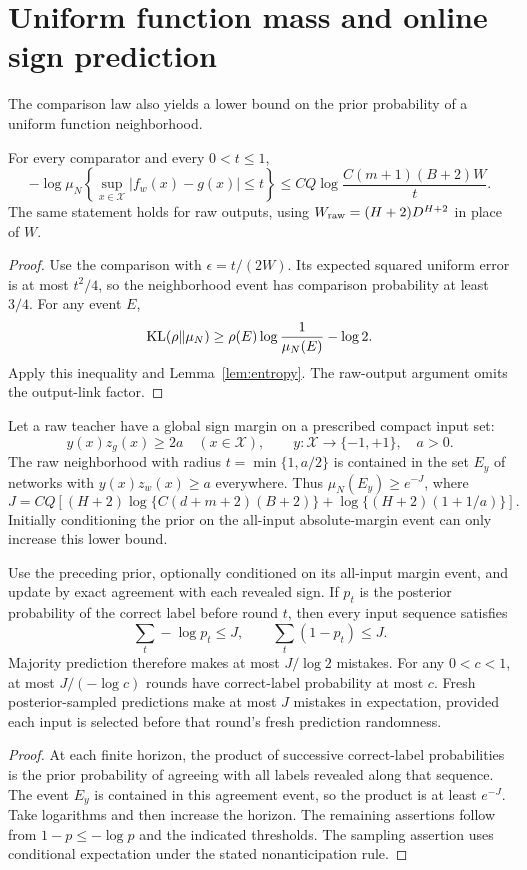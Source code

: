 \section{Uniform function mass and online sign prediction}
The comparison law also yields a lower bound on the prior probability of a uniform function neighborhood.

\begin{theorem}\label{thm:uniform-mass}
For every comparator and every $0<t\le1$,
\[
 -\log\mu_N\left\{\sup_{x\in\mathcal X}|f_w(x)-g(x)|\le t\right\}
 \le C Q\log\frac{C(m+1)(B+2)W}{t}.
\]
The same statement holds for raw outputs, using
$W_{\rm raw}=(H+2)D^{H+2}$ in place of $W$.
\end{theorem}
\begin{proof}
Use the comparison with $\epsilon=t/(2W)$. Its expected squared uniform error is at most $t^2/4$, so the neighborhood event has comparison probability at least $3/4$. For any event $E$,
\[
 \operatorname{KL}(\rho\|\mu_N)\ge\rho(E)\log\frac1{\mu_N(E)}-\log2.
\]
Apply this inequality and Lemma~\ref{lem:entropy}. The raw-output argument omits the output-link factor.
\end{proof}

Let a raw teacher have a global sign margin on a prescribed compact input set:
\[
 y(x)z_g(x)\ge2a\quad(x\in\mathcal X),
 \qquad y:\mathcal X\to\{-1,+1\},\quad a>0.
\]
The raw neighborhood with radius $t=\min\{1,a/2\}$ is contained in the set $E_y$ of networks with $y(x)z_w(x)\ge a$ everywhere. Thus $\mu_N(E_y)\ge e^{-J}$, where
\[
 J=CQ\left[(H+2)\log\{C(d+m+2)(B+2)\}
           +\log\{(H+2)(1+1/a)\}\right].
\]
Initially conditioning the prior on the all-input absolute-margin event can only increase this lower bound.

\begin{corollary}\label{cor:online}
Use the preceding prior, optionally conditioned on its all-input margin event, and update by exact agreement with each revealed sign. If $p_t$ is the posterior probability of the correct label before round $t$, then every input sequence satisfies
\[
 \sum_t-\log p_t\le J,\qquad \sum_t(1-p_t)\le J.
\]
Majority prediction therefore makes at most $J/\log2$ mistakes. For any $0<c<1$, at most $J/(-\log c)$ rounds have correct-label probability at most $c$. Fresh posterior-sampled predictions make at most $J$ mistakes in expectation, provided each input is selected before that round's fresh prediction randomness.
\end{corollary}
\begin{proof}
At each finite horizon, the product of successive correct-label probabilities is the prior probability of agreeing with all labels revealed along that sequence. The event $E_y$ is contained in this agreement event, so the product is at least $e^{-J}$. Take logarithms and then increase the horizon. The remaining assertions follow from $1-p\le-\log p$ and the indicated thresholds. The sampling assertion uses conditional expectation under the stated nonanticipation rule.
\end{proof}

